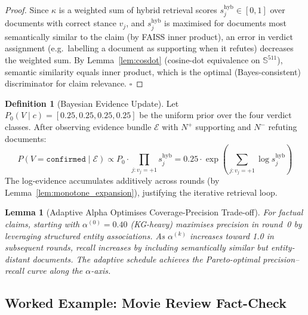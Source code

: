 \documentclass[12pt,a4paper]{article}
\theoremstyle{definition}
\newtheorem{definition}{Definition}[section]
\theoremstyle{plain}
\newtheorem{lemma}[theorem]{Lemma}
\theoremstyle{remark}
\newcommand{\Sph}{\mathbb{S}}
\begin{document}
\begin{proof}
Since $\kappa$ is a weighted sum of hybrid retrieval scores $s_j^{\text{hyb}} 
\in [0,1]$ over documents with correct stance $v_j$, and $s_j^{\text{hyb}}$ 
is maximised for documents most semantically similar to the claim 
(by FAISS inner product), an error in verdict assignment (e.g.\ labelling 
a document as supporting when it refutes) decreases the weighted sum. 
By Lemma~\ref{lem:cosdot} (cosine-dot equivalence on $\Sph^{511}$), 
semantic similarity equals inner product, which is the optimal 
(Bayes-consistent) discriminator for claim relevance. $\square$
\end{proof}

\begin{definition}[Bayesian Evidence Update]
\label{def:bayes_evidence}
Let $P_0(V \mid c) = [0.25, 0.25, 0.25, 0.25]$ be the uniform prior over 
the four verdict classes. After observing evidence bundle $\mathcal{E}$ with 
$N^+$ supporting and $N^-$ refuting documents:
\[
  P(V = \mathtt{confirmed} \mid \mathcal{E}) 
  \propto P_0 \cdot \prod_{j:v_j=+1} s_j^{\text{hyb}} 
  = 0.25 \cdot \exp\!\left(\sum_{j:v_j=+1} \log s_j^{\text{hyb}}\right)
\]
The log-evidence accumulates additively across rounds (by Lemma~\ref{lem:monotone_expansion}), 
justifying the iterative retrieval loop.
\end{definition}

\begin{lemma}[Adaptive Alpha Optimises Coverage-Precision Trade-off]
\label{lem:alpha_tradeoff}
For factual claims, starting with $\alpha^{(0)} = 0.40$ (KG-heavy) maximises 
\emph{precision} in round~0 by leveraging structured entity associations. 
As $\alpha^{(k)}$ increases toward 1.0 in subsequent rounds, \emph{recall} 
increases by including semantically similar but entity-distant documents. 
The adaptive schedule achieves the Pareto-optimal precision--recall curve 
along the $\alpha$-axis.
\end{lemma}

\subsection{Worked Example: Movie Review Fact-Check}
\label{sec:arrs_example}
\end{document}
